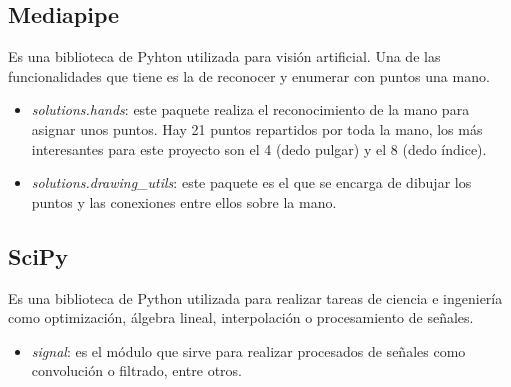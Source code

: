 \subsection{Mediapipe}
Es una biblioteca de Pyhton utilizada para visión artificial. Una de las funcionalidades que tiene es la de reconocer y enumerar con puntos una mano.
\begin{itemize}
\item \textit{solutions.hands}: este paquete realiza el reconocimiento de la mano para asignar unos puntos. Hay 21 puntos repartidos por toda la mano, los más interesantes para este proyecto son el 4 (dedo pulgar) y el 8 (dedo índice).
\item \textit{solutions.drawing\_utils}: este paquete es el que se encarga de dibujar los puntos y las conexiones entre ellos sobre la mano.
\end{itemize}
\subsection{SciPy}
Es una biblioteca de Python utilizada para realizar tareas de ciencia e ingeniería como optimización, álgebra lineal, interpolación o procesamiento de señales.\cite{wiki:scipy}
\begin{itemize}
\item \textit{signal}: es el módulo que sirve para realizar procesados de señales como convolución o filtrado, entre otros.\cite{scipysignal}
\end{itemize}
